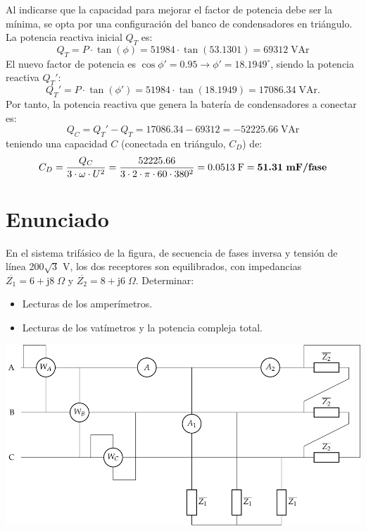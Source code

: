 Al indicarse que la capacidad para mejorar el factor de potencia debe ser la {mínima}, se opta por una configuración del banco de condensadores en {triángulo}. La potencia reactiva inicial $Q_T$ es:
\begin{equation*}
    Q_T=P\cdot \tan(\phi)=51984\cdot \tan(53.1301)=69312\;\text{VAr}
\end{equation*}
El nuevo factor de potencia es $\cos{\phi'}=0.95\rightarrow\phi'=18.1949^\circ$, siendo la potencia reactiva $Q_T'$:
\begin{equation*}
    Q_T'=P\cdot \tan(\phi')=51984\cdot \tan(18.1949)=17086.34\;\text{VAr}.
\end{equation*}
Por tanto, la potencia reactiva que genera la batería de condensadores a conectar es: 
\begin{equation*}
    Q_C=Q_T'-Q_T=17086.34-69312=-52225.66\;\text{VAr}
\end{equation*}
teniendo una capacidad $C$ (conectada en triángulo, $C_D$) de:
\begin{equation*}
    C_D=\dfrac{Q_C}{3\cdot\omega\cdot U^2}=\dfrac{52225.66}{3\cdot 2\cdot\pi\cdot 60\cdot 380^2}=0.0513\;\text{F}=\textbf{51.31\;\text{mF/fase}}
\end{equation*}




\section{Enunciado}
 
En el sistema trifásico de la figura, de secuencia de fases inversa y tensión de línea 200$\sqrt{3}$ V, los dos receptores son equilibrados, con impedancias $\overline{Z_1} = 6+\mathrm{j}8\;\Omega$ y $\overline{Z_2} = 8+\mathrm{j}6\;\Omega$. Determinar:
\begin{itemize}
    \item  Lecturas de los amperímetros.
    \item  Lecturas de los vatímetros y la potencia compleja total.
\end{itemize}
\begin{center}
  \includegraphics[width=.8\linewidth]{figuras/ej5_BT3.pdf}
\end{center}

